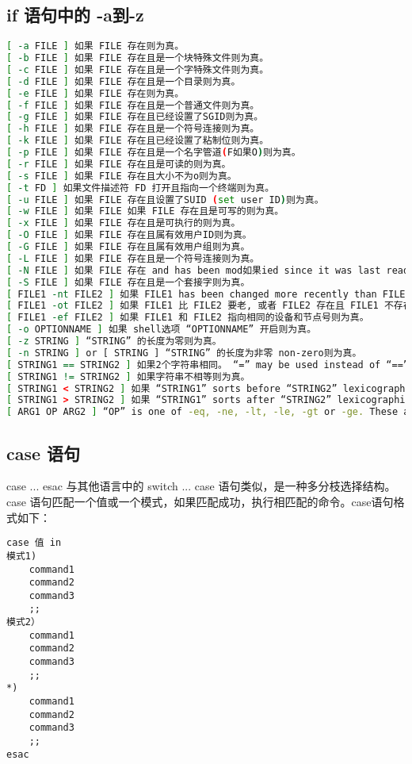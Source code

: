 \subsection{if 语句中的 -a到-z}
\begin{lstlisting}[language=sh]
[ -a FILE ] 如果 FILE 存在则为真。
[ -b FILE ] 如果 FILE 存在且是一个块特殊文件则为真。
[ -c FILE ] 如果 FILE 存在且是一个字特殊文件则为真。
[ -d FILE ] 如果 FILE 存在且是一个目录则为真。
[ -e FILE ] 如果 FILE 存在则为真。
[ -f FILE ] 如果 FILE 存在且是一个普通文件则为真。
[ -g FILE ] 如果 FILE 存在且已经设置了SGID则为真。
[ -h FILE ] 如果 FILE 存在且是一个符号连接则为真。
[ -k FILE ] 如果 FILE 存在且已经设置了粘制位则为真。
[ -p FILE ] 如果 FILE 存在且是一个名字管道(F如果O)则为真。
[ -r FILE ] 如果 FILE 存在且是可读的则为真。
[ -s FILE ] 如果 FILE 存在且大小不为o则为真。
[ -t FD ] 如果文件描述符 FD 打开且指向一个终端则为真。
[ -u FILE ] 如果 FILE 存在且设置了SUID (set user ID)则为真。
[ -w FILE ] 如果 FILE 如果 FILE 存在且是可写的则为真。
[ -x FILE ] 如果 FILE 存在且是可执行的则为真。
[ -O FILE ] 如果 FILE 存在且属有效用户ID则为真。
[ -G FILE ] 如果 FILE 存在且属有效用户组则为真。
[ -L FILE ] 如果 FILE 存在且是一个符号连接则为真。
[ -N FILE ] 如果 FILE 存在 and has been mod如果ied since it was last read则为真。
[ -S FILE ] 如果 FILE 存在且是一个套接字则为真。
[ FILE1 -nt FILE2 ] 如果 FILE1 has been changed more recently than FILE2, or 如果 FILE1 exists and FILE2 does not则为真。
[ FILE1 -ot FILE2 ] 如果 FILE1 比 FILE2 要老, 或者 FILE2 存在且 FILE1 不存在则为真。
[ FILE1 -ef FILE2 ] 如果 FILE1 和 FILE2 指向相同的设备和节点号则为真。
[ -o OPTIONNAME ] 如果 shell选项 “OPTIONNAME” 开启则为真。
[ -z STRING ] “STRING” 的长度为零则为真。
[ -n STRING ] or [ STRING ] “STRING” 的长度为非零 non-zero则为真。
[ STRING1 == STRING2 ] 如果2个字符串相同。 “=” may be used instead of “==” for strict POSIX compliance则为真。
[ STRING1 != STRING2 ] 如果字符串不相等则为真。
[ STRING1 < STRING2 ] 如果 “STRING1” sorts before “STRING2” lexicographically in the current locale则为真。
[ STRING1 > STRING2 ] 如果 “STRING1” sorts after “STRING2” lexicographically in the current locale则为真。
[ ARG1 OP ARG2 ] “OP” is one of -eq, -ne, -lt, -le, -gt or -ge. These arithmetic binary operators return true if “ARG1” is equal to, not equal to, less than, less than or equal to, greater than, or greater than or equal to “ARG2”, respectively. “ARG1” and “ARG2” are integers.
\end{lstlisting}



\subsection{case 语句}
case ... esac 与其他语言中的 switch ... case 语句类似，是一种多分枝选择结构。case 语句匹配一个值或一个模式，如果匹配成功，执行相匹配的命令。case语句格式如下：
\begin{verbatim}
case 值 in
模式1)
    command1
    command2
    command3
    ;;
模式2）
    command1
    command2
    command3
    ;;
*)
    command1
    command2
    command3
    ;;
esac
\end{verbatim}

